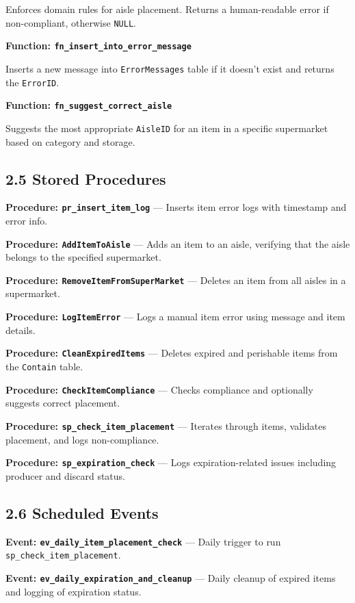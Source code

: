 \documentclass[a4paper,12pt]{article}
\begin{document}
Enforces domain rules for aisle placement. Returns a human-readable error if non-compliant, otherwise \texttt{NULL}.

\textbf{Function: \texttt{fn\_insert\_into\_error\_message}}

Inserts a new message into \texttt{ErrorMessages} table if it doesn’t exist and returns the \texttt{ErrorID}.

\textbf{Function: \texttt{fn\_suggest\_correct\_aisle}}

Suggests the most appropriate \texttt{AisleID} for an item in a specific supermarket based on category and storage.

\subsection*{2.5 Stored Procedures}

\textbf{Procedure: \texttt{pr\_insert\_item\_log}} — Inserts item error logs with timestamp and error info.

\textbf{Procedure: \texttt{AddItemToAisle}} — Adds an item to an aisle, verifying that the aisle belongs to the specified supermarket.

\textbf{Procedure: \texttt{RemoveItemFromSuperMarket}} — Deletes an item from all aisles in a supermarket.

\textbf{Procedure: \texttt{LogItemError}} — Logs a manual item error using message and item details.

\textbf{Procedure: \texttt{CleanExpiredItems}} — Deletes expired and perishable items from the \texttt{Contain} table.

\textbf{Procedure: \texttt{CheckItemCompliance}} — Checks compliance and optionally suggests correct placement.

\textbf{Procedure: \texttt{sp\_check\_item\_placement}} — Iterates through items, validates placement, and logs non-compliance.

\textbf{Procedure: \texttt{sp\_expiration\_check}} — Logs expiration-related issues including producer and discard status.

\subsection*{2.6 Scheduled Events}

\textbf{Event: \texttt{ev\_daily\_item\_placement\_check}} — Daily trigger to run \texttt{sp\_check\_item\_placement}.

\textbf{Event: \texttt{ev\_daily\_expiration\_and\_cleanup}} — Daily cleanup of expired items and logging of expiration status.
\end{document}
